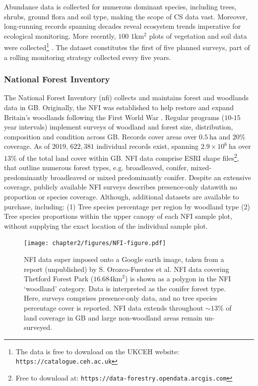 Abundance data is collected for numerous dominant species, including trees, shrubs, ground flora and soil type, 
making the scope of CS data vast. Moreover, long-running records spanning decades reveal ecosystem trends imperative for ecological monitoring.
More recently, $100$ $1\mathrm{km^2}$ plots of vegetation and soil data were collected\footnote{
The data is free to download on the UKCEH website: \nolinkurl{https://catalogue.ceh.ac.uk}} \cite{10.5285/fd6ae272-aeb5-4573-8e8a-7ccfae64f506}.
The dataset constitutes the first of five planned surveys, part of a rolling monitoring strategy collected every five years.

\subsubsection{National Forest Inventory}

The National Forest Inventory (\acrshort{nfi}) collects and maintains forest and woodlands data in GB.
Originally, the NFI was established to help restore and expand Britain's woodlands following the First World War \cite{james1990history}.
Regular programs ($10$-$15$ year intervals) implement surveys of woodland and forest size, distribution, composition and condition across GB.
Records cover areas over $0.5\ \mathrm{ha}$ and $20\%$ coverage.
As of $2019$, $622,381$ individual records exist, spanning $2.9 \times 10^6\ \mathrm{ha}$ over $13\%$ of the total land cover within GB.
NFI data comprise ESRI shape files\footnote{
Free to download at: \nolinkurl{https://data-forestry.opendata.arcgis.com}},
that outline numerous forest types, e.g. broadleaved, conifer, mixed-predominantly broadleaved or mixed predominantly conifer.
Despite an extensive coverage, publicly available NFI surveys describes presence-only data\textemdash with no proportion or species coverage.
Although, additional datasets are available to purchase, including: 
(1) Tree species percentage per region by woodland type
(2) Tree species proportions within the upper canopy of each NFI sample plot, without supplying the exact location of the individual sample plot.

\begin{figure}
    \centering
    \texttt{[image: chapter2/figures/NFI-figure.pdf]}
    \caption{NFI data super imposed onto a Google earth image, taken from a report (unpublished) by S. Orozco-Fuentes et al.
             NFI data covering Thetford Forest Park ($16.684 \mathrm{km}^2$) is shown as a polygon in the NFI `woodland' category.
             Data is interpreted as the conifer forest type. Here, surveys comprises presence-only data, and no tree species percentage cover
             is reported. NFI data extends throughout $\sim 13\%$ of land coverage in GB and large non-woodland areas remain un-surveyed.}
    \label{fig:NFI-data}
\end{figure}

